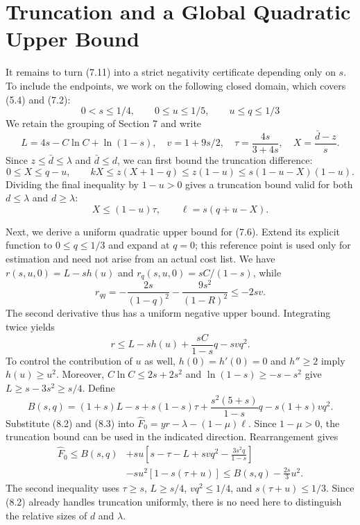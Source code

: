\documentclass[11pt,a4paper]{article}
\begin{document}
\section{Truncation and a Global Quadratic Upper Bound}

It remains to turn (7.11) into a strict negativity certificate depending only on $s$. To include the endpoints, we work on the following closed domain, which covers (5.4) and (7.2):
\begin{equation}
0<s\le1/4,\qquad0\le u\le1/5,\qquad u\le q\le1/3
\tag{8.1}
\end{equation}
We retain the grouping of Section 7 and write
\[
L=4s-C\ln C+\ln(1-s),\quad v=1+9s/2,\quad
\tau=\frac{4s}{3+4s},\quad X=\frac{\bar d-z}{s}.
\]
Since $z\le\bar d\le\lambda$ and $\bar d\le d$, we can first bound the truncation difference:
\[
0\le X\le q-u,\qquad
kX\le z(X+1-q)\le z(1-u)\le s(1-u-X)(1-u).
\]
Dividing the final inequality by $1-u>0$ gives a truncation bound valid for both $d\le\lambda$ and $d\ge\lambda$:
\begin{equation}
X\le(1-u)\tau,\qquad \ell=s(q+u-X).
\tag{8.2}
\end{equation}

Next, we derive a uniform quadratic upper bound for (7.6). Extend its explicit function to $0\le q\le1/3$ and expand at $q=0$; this reference point is used only for estimation and need not arise from an actual cost list.
We have $r(s,u,0)=L-sh(u)$ and $r_q(s,u,0)=sC/(1-s)$, while
\[
r_{qq}=-\frac{2s}{(1-q)^2}-\frac{9s^2}{(1-R)^2}\le-2sv.
\]
The second derivative thus has a uniform negative upper bound. Integrating twice yields
\begin{equation}
r\le L-sh(u)+\frac{sC}{1-s}q-svq^2.
\tag{8.3}
\end{equation}
To control the contribution of $u$ as well, $h(0)=h'(0)=0$ and $h''\ge2$ imply $h(u)\ge u^2$. Moreover, $C\ln C\le2s+2s^2$ and $\ln(1-s)\ge-s-s^2$ give $L\ge s-3s^2\ge s/4$. Define
\[
B(s,q)=(1+s)L-s+s(1-s)\tau
+\frac{s^2(5+s)}{1-s}q-s(1+s)vq^2.
\]
Substitute (8.2) and (8.3) into $\widehat F_0=yr-\lambda-(1-\mu)\ell$. Since $1-\mu>0$, the truncation bound can be used in the indicated direction. Rearrangement gives
\begin{equation}
\begin{aligned}
\widehat F_0\le B(s,q)
&+su\left[s-\tau-L+svq^2-\frac{3s^2q}{1-s}\right]\\
&-su^2[1-s(\tau+u)]
\le B(s,q)-\frac{2s}{3}u^2.
\end{aligned}
\tag{8.4}
\end{equation}
The second inequality uses $\tau\ge s$, $L\ge s/4$, $vq^2\le1/4$, and $s(\tau+u)\le1/3$. Since (8.2) already handles truncation uniformly, there is no need here to distinguish the relative sizes of $d$ and $\lambda$.
\end{document}
